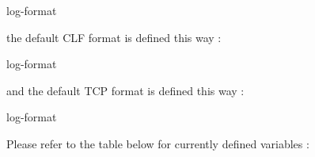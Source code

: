     log-format %

the default CLF format is defined this way :

    log-format %

and the default TCP format is defined this way :

    log-format %

Please refer to the table below for currently defined variables :

